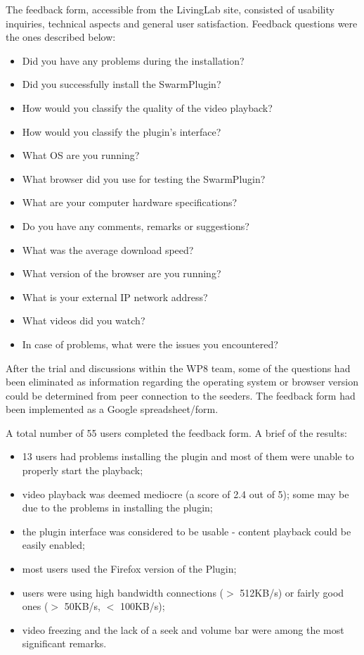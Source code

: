 The feedback form, accessible from the LivingLab site, consisted of usability
inquiries, technical aspects and general user satisfaction. Feedback questions
were the ones described below:
\begin{itemize}
  \item Did you have any problems during the installation?
  \item Did you successfully install the SwarmPlugin?
  \item How would you classify the quality of the video playback?
  \item How would you classify the plugin's interface?
  \item What OS are you running?
  \item What browser did you use for testing the SwarmPlugin?
  \item What are your computer hardware specifications?
  \item Do you have any comments, remarks or suggestions?
  \item What was the average download speed?
  \item What version of the browser are you running?
  \item What is your external IP network address?
  \item What videos did you watch?
  \item In case of problems, what were the issues you encountered?
\end{itemize}

After the trial and discussions within the WP8 team, some of the questions had
been eliminated as information regarding the operating system or browser
version could be determined from peer connection to the seeders. The feedback
form had been implemented as a Google spreadsheet/form.

A total number of 55 users completed the feedback form. A brief of the
results:
\begin{itemize}
  \item 13 users had problems installing the plugin and most of them were
  unable to properly start the playback;
  \item video playback was deemed mediocre (a score of 2.4 out of 5); some may
  be due to the problems in installing the plugin;
  \item the plugin interface was considered to be usable - content playback
  could be easily enabled;
  \item most users used the Firefox version of the Plugin;
  \item users were using high bandwidth connections ($>$ 512KB/s) or fairly
  good ones ($>$ 50KB/s, $<$ 100KB/s);
  \item video freezing and the lack of a seek and volume bar were among the
  most significant remarks.
\end{itemize}

